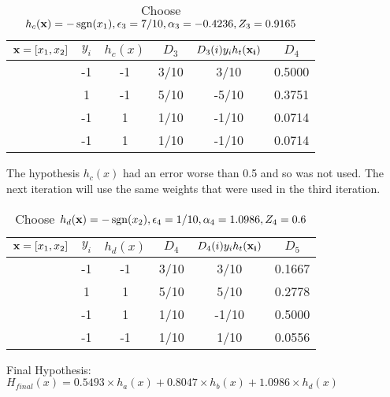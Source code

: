 \begin{table}[H]
  \centering
  \caption{Choose $h_c({\bf x}) = -\operatorname{sgn}(x_1), \epsilon_3 = 7/10, \alpha_3 = -0.4236, Z_3 = 0.9165$}
  \label{tab:Ada1}
  \begin{tabular}{|c|c|c|c|c|c|}
    \hline
    ${\bf x} = [x_1,x_2]$ & $y_i$ & $h_c(x)$ & $D_3$ & $D_{3}(i)y_{i}h_t({\bf x_i})$ & $D_4$ \\ \hline
    [1,1]          &     -1  & -1    & 3/10   & 3/10                          &  0.5000     \\ \hline
    [1,-1]         &    1   & -1    & 5/10   & -5/10                          &    0.3751   \\ \hline
    [-1,-1]        &     -1  & 1    & 1/10   & -1/10                           & 0.0714      \\ \hline
    [-1,1]         &     -1 & 1    & 1/10   & -1/10                           &  0.0714     \\ \hline
  \end{tabular}
\end{table}

The hypothesis $h_c(x)$ had an error worse than 0.5 and so was not used. The next iteration will use the same weights that were used in the third iteration.

\begin{table}[H]
  \centering
  \caption{Choose $h_d({\bf x}) = -\operatorname{sgn}(x_2), \epsilon_4 = 1/10, \alpha_4 = 1.0986, Z_4 = 0.6$}
  \label{tab:Ada1}
  \begin{tabular}{|c|c|c|c|c|c|}
    \hline
    ${\bf x} = [x_1,x_2]$ & $y_i$ & $h_d(x)$ & $D_4$ & $D_{4}(i)y_{i}h_t({\bf x_i})$ & $D_5$ \\ \hline
    [1,1]          &     -1  & -1    & 3/10   & 3/10                          &  0.1667     \\ \hline
    [1,-1]         &    1   & 1    & 5/10   & 5/10                          &    0.2778   \\ \hline
    [-1,-1]        &     -1  & 1    & 1/10   & -1/10                           & 0.5000      \\ \hline
    [-1,1]         &     -1 & -1    & 1/10   & 1/10                           &  0.0556     \\ \hline
  \end{tabular}
\end{table}

Final Hypothesis:
$H_{final}(x) = 0.5493 \times h_a(x) + 0.8047 \times h_b(x) + 1.0986 \times h_d(x)$


